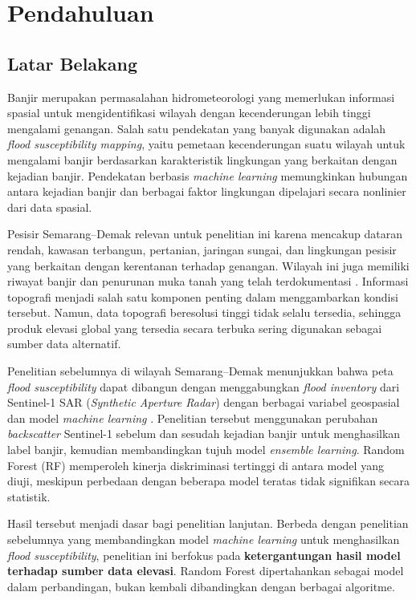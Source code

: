 \documentclass[12pt]{article}
\begin{document}
\section{Pendahuluan}

\subsection{Latar Belakang}

Banjir merupakan permasalahan hidrometeorologi yang memerlukan informasi
spasial untuk mengidentifikasi wilayah dengan kecenderungan lebih tinggi
mengalami genangan. Salah satu pendekatan yang
banyak digunakan adalah \textit{flood susceptibility mapping}, yaitu pemetaan
kecenderungan suatu wilayah untuk mengalami banjir berdasarkan karakteristik
lingkungan yang berkaitan dengan kejadian banjir. Pendekatan berbasis
\textit{machine learning} memungkinkan hubungan antara kejadian banjir dan
berbagai faktor lingkungan dipelajari secara nonlinier dari data spasial.

Pesisir Semarang--Demak relevan untuk penelitian ini karena mencakup
dataran rendah, kawasan terbangun, pertanian, jaringan sungai, dan lingkungan
pesisir yang berkaitan dengan kerentanan terhadap genangan. Wilayah ini juga
memiliki riwayat banjir dan penurunan muka tanah yang telah terdokumentasi
\cite{marfai2008,abidin2015,Husnayaen2018,Sakina2025}. Informasi topografi
menjadi salah satu komponen penting dalam menggambarkan kondisi tersebut.
Namun, data topografi beresolusi tinggi tidak selalu tersedia, sehingga
produk elevasi global yang tersedia secara terbuka sering digunakan sebagai
sumber data alternatif.

Penelitian sebelumnya di wilayah Semarang--Demak menunjukkan bahwa peta
\textit{flood susceptibility} dapat dibangun dengan menggabungkan
\textit{flood inventory} dari Sentinel-1 SAR (\textit{Synthetic Aperture
Radar}) dengan berbagai variabel geospasial dan model \textit{machine learning} \cite{hakim2026}. Penelitian
tersebut menggunakan perubahan \textit{backscatter} Sentinel-1 sebelum dan
sesudah kejadian banjir untuk menghasilkan label banjir, kemudian membandingkan
tujuh model \textit{ensemble learning}. Random Forest (RF) memperoleh kinerja
diskriminasi tertinggi di antara model yang diuji, meskipun perbedaan dengan
beberapa model teratas tidak signifikan secara statistik.

Hasil tersebut menjadi dasar bagi penelitian lanjutan. Berbeda dengan
penelitian sebelumnya yang membandingkan model \textit{machine learning}
untuk menghasilkan \textit{flood susceptibility}, penelitian ini berfokus
pada \textbf{ketergantungan hasil model terhadap sumber data elevasi}.
Random Forest dipertahankan sebagai model dalam perbandingan, bukan kembali
dibandingkan dengan berbagai algoritme.
\end{document}
